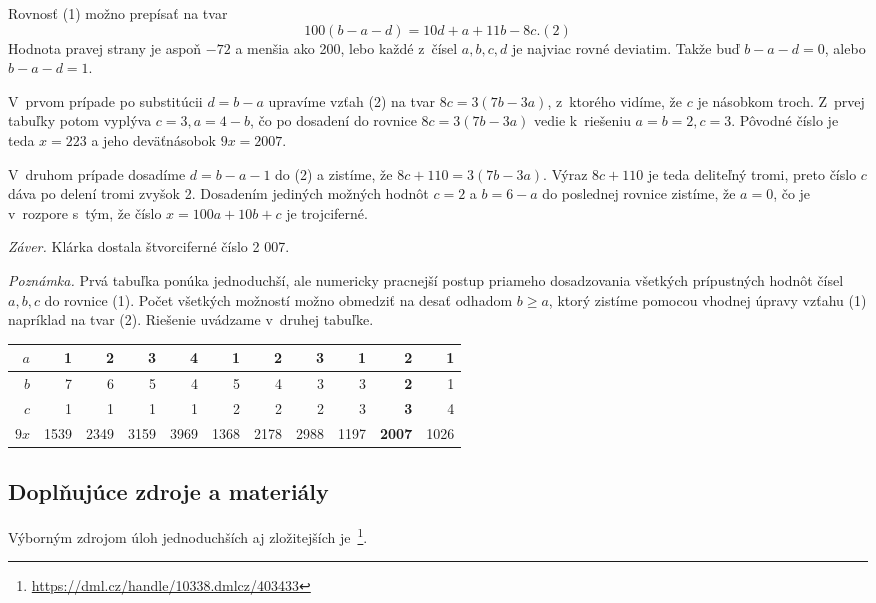 Rovnosť (1) možno prepísať na tvar
$$ 100(b - a - d) = 10d + a + 11b - 8c. (2)$$
Hodnota pravej strany je aspoň $-72$ a menšia ako 200, lebo každé z~čísel $a, b, c, d$ je najviac rovné deviatim. Takže buď $b - a - d = 0$, alebo $b - a - d = 1$.

V~prvom prípade po substitúcii $d = b - a$ upravíme vzťah (2) na tvar $8c = 3(7b - 3a)$, z~ktorého vidíme, že $c$ je násobkom troch. Z~prvej tabuľky potom vyplýva $c = 3, a = 4 - b$, čo po dosadení do rovnice $8c = 3(7b - 3a)$ vedie k~riešeniu $a = b = 2, c = 3$. Pôvodné číslo je teda $x = 223$ a jeho deväťnásobok $9x = 2 007.$

V~druhom prípade dosadíme $d = b - a - 1$ do (2) a zistíme, že $8c + 110 = 3(7b-3a)$. Výraz $8c+110$ je teda deliteľný tromi, preto číslo $c$ dáva po delení tromi zvyšok 2. Dosadením jediných možných hodnôt $c = 2$ a $b = 6 - a$ do poslednej rovnice zistíme, že $a = 0$, čo je v~rozpore s~tým, že číslo $x = 100a + 10b + c$ je trojciferné.

\textit{Záver.} Klárka dostala štvorciferné číslo 2 007.

\textit{Poznámka.} Prvá tabuľka ponúka jednoduchší, ale numericky pracnejší postup priameho dosadzovania všetkých prípustných hodnôt čísel $a, b, c$ do rovnice (1). Počet všetkých možností možno obmedziť na desať odhadom $b \geq a$, ktorý zistíme pomocou vhodnej úpravy vzťahu (1) napríklad na tvar (2). Riešenie uvádzame v~druhej tabuľke.
\begin{center}
\begin{tabular}{|r||r|r|r|r|r|r|r|r|r|r|}
\hline
$a$ & 1 & 2 & 3 & 4 & 1 & 2 & 3 & 1 & \textbf{2} & 1\\
\hline
$b$ & 7 & 6 & 5 & 4 & 5 & 4 & 3 & 3 & \textbf{2} & 1 \\
\hline
$c$ & 1 & 1 & 1 & 1 & 2 & 2 & 2 & 3 & \textbf{3} & 4 \\
\hline
$9x$ & 1539 & 2349 & 3159 & 3969 & 1368 & 2178 & 2988 & 1197 & \textbf{2007} & 1026\\
\hline
\end{tabular}
\end{center}
\subsection*{Doplňujúce zdroje a materiály}
Výborným zdrojom úloh jednoduchších aj zložitejších je~\cite{sedlacek1961}\footnote{\url{https://dml.cz/handle/10338.dmlcz/403433}}.

